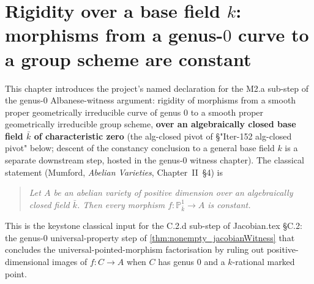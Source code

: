 \chapter{Rigidity over a base field \(k\): morphisms from a genus-\(0\) curve to a group scheme are constant}
\label{chap:RigidityKbar}


This chapter introduces the project's named declaration for the M2.a sub-step of the genus-\(0\) Albanese-witness argument: rigidity of morphisms from a smooth proper geometrically irreducible curve of genus \(0\) to a smooth proper geometrically irreducible group scheme, \textbf{over an algebraically closed base field \(\bar k\) of characteristic zero} (the alg-closed pivot of \S "Iter-152 alg-closed pivot" below; descent of the constancy conclusion to a general base field \(k\) is a separate downstream step, hosted in the genus-\(0\) witness chapter). The classical statement (Mumford, \emph{Abelian Varieties}, Chapter~II~\S4) is

\begin{quote}
  \emph{Let \(A\) be an abelian variety of positive dimension over an algebraically closed field \(\bar k\). Then every morphism \(f \colon \mathbb P^1_{\bar k} \to A\) is constant.}
\end{quote}

This is the keystone classical input for the C.2.d sub-step of Jacobian.tex \S C.2: the genus-\(0\) universal-property step of \cref{thm:nonempty_jacobianWitness} that concludes the universal-pointed-morphism factorisation by ruling out positive-dimensional images of \(f \colon C \to A\) when \(C\) has genus \(0\) and a \(k\)-rational marked point.


